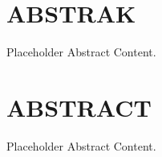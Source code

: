 
\section*{ABSTRAK}
Placeholder Abstract Content.

\vspace{1cm}

\section*{ABSTRACT}
Placeholder Abstract Content.

\vspace{1cm}

